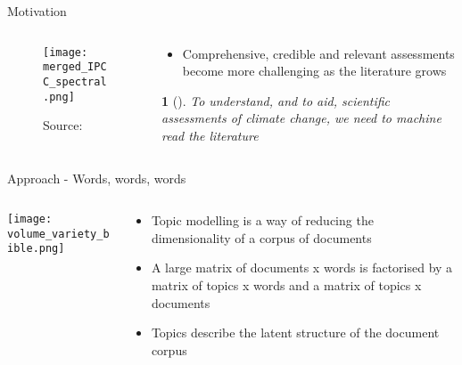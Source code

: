 \documentclass[9pt]{beamer}
\newtheorem*{remark}{}
\begin{document}
\begin{frame}{Motivation}

\begin{columns}
	\begin{column}{0.5\linewidth}
		\begin{center}
\begin{figure}
	\texttt{[image: merged\_IPCC\_spectral.png]}
	\caption{Source: \citet{Minx2017l} }
\end{figure}
		\end{center}
	\end{column}
	\begin{column}{0.5\linewidth}
		\begin{center}
			\begin{itemize}
				\item Comprehensive, credible and relevant assessments become
				more challenging as the literature grows
			\end{itemize}
		\begin{remark}[]
			To understand, and to aid, scientific assessments of climate change, we need to machine read the literature
		\end{remark}
		\end{center}
	\end{column}
\end{columns}

\end{frame}

\begin{frame}{Approach - Words, words, words}

\begin{columns}
	\begin{column}{0.5\linewidth}
		\begin{center}
			\texttt{[image: volume\_variety\_bible.png]}
		\end{center}
	\end{column}
	\begin{column}{0.5\linewidth}
		\begin{center}
			\begin{itemize}
				\item Topic modelling is a way of reducing the dimensionality of a corpus of documents
				\item A large matrix of documents x words is factorised by
				a matrix of topics x words and a matrix of topics x documents
			\citep{Lee1999}
				\item Topics describe the latent structure of the document corpus
				
			\end{itemize}
		\end{center}
	\end{column}
\end{columns}

\end{frame}
\end{document}
